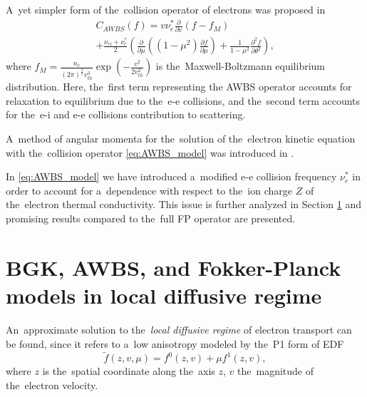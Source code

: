 \documentclass[
 aps,
 jmp,
 amsmath,amssymb,
 twocolumn,
]{revtex4-1}
\newcommand{\pdv}[2]{\frac{\partial{#1}}{\partial{#2}}}
\newcommand{\Zbar}{Z}
\newcommand{\nue}{\nu_{e}}
\newcommand{\nuei}{\nu_{ei}}
\newcommand{\vmag}{v}
\newcommand{\vth}{v_{th}}
\newcommand{\fM}{f_M}
\newcommand{\ft}{f}
\begin{document}
A~yet simpler form of the~collision operator of electrons was proposed in 
\cite{Sorbo_2015}
\begin{multline}
  C_{AWBS}(\ft) = \vmag \nue^*\pdv{}{\vmag}\left(\ft - \fM\right) \\
  + \frac{\nuei + \nue^*}{2} 
  \left(\pdv{}{\mu}\left((1 - \mu^2)\pdv{f}{\mu}\right)
  + \frac{1}{1-\mu^2}\frac{\partial^2f}{\partial\theta^2} \right)
  , \label{eq:AWBS_model}
\end{multline}
where $\fM = \frac{n_e}{(2\pi)^{\frac{3}{2}}\vth^3}
\exp\left(-\frac{\vmag^2}{2\vth^2}\right)$ 
is the~Maxwell-Boltzmann equilibrium distribution.
Here, the~first term representing the AWBS operator \cite{AWBS_PRL1986}
accounts for relaxation to equilibrium due to the~e-e collisions, and 
the~second term accounts for the~e-i and e-e collisions contribution 
to scattering.

A~method of angular momenta for the~solution of the~electron kinetic equation
with the~collision operator \eqref{eq:AWBS_model} 
was introduced in \cite{Sorbo_2015, Sorbo_2016}. 

In \eqref{eq:AWBS_model} we have introduced a~modified e-e collision frequency
$\nue^*$ in order to account for a~dependence with respect to 
the~ion charge $\Zbar$ of the~electron thermal conductivity. This issue
is further analyzed in Section \ref{sec:DiffusiveKinetics} and promising 
results compared to the~full FP operator are presented.

\section{BGK, AWBS, and Fokker-Planck models in local diffusive regime}
\label{sec:DiffusiveKinetics}
An~approximate solution to the~\textit{local diffusive regime} 
of electron transport can be found, since it
refers to a~low anisotropy modeled by the~P1 form of EDF  
\begin{equation}
  \tilde{\ft}(z, \vmag, \mu) = \ft^0(z, \vmag) + \mu \ft^1(z, \vmag),
  \label{eq:f_approximation}
\end{equation}
where $z$ is the~spatial coordinate along the~axis $z$, $\vmag$ 
the~magnitude of the~electron velocity. 
\end{document}
